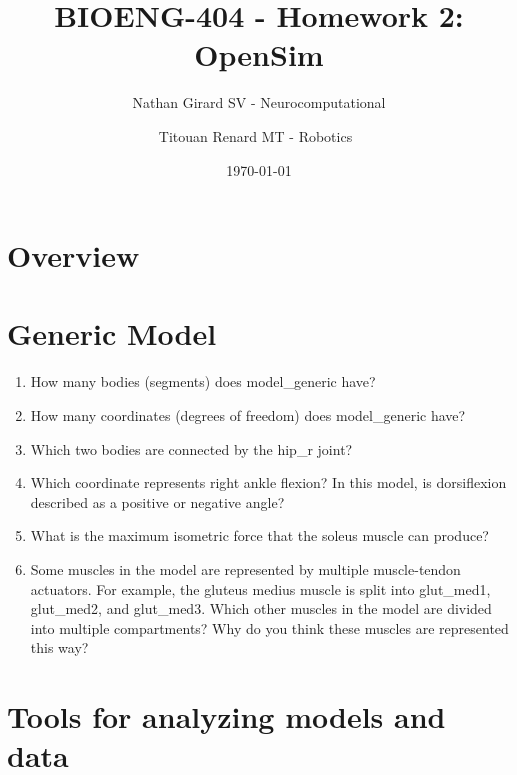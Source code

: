 \documentclass[11pt]{article}
\title{BIOENG-404 - Homework 2: OpenSim}
\author{
    Nathan Girard
        SV - Neurocomputational
        \and
    Titouan Renard
            MT - Robotics 
}
\date{\today}
\begin{document}
\maketitle

\section{Overview}

\section{Generic Model}

\begin{enumerate}
    \item How many bodies (segments) does model\_generic have?
    \item How many coordinates (degrees of freedom) does model\_generic have?
    \item Which two bodies are connected by the hip\_r joint?
    \item Which coordinate represents right ankle flexion? In this model, is dorsiflexion described as a positive or negative angle?
    \item What is the maximum isometric force that the soleus muscle can produce?
    \item Some muscles in the model are represented by multiple muscle-tendon actuators. For example, the gluteus medius muscle is split into glut\_med1, glut\_med2, and glut\_med3. Which other muscles in the model are divided into multiple compartments? Why do you think these muscles are represented this way?
\end{enumerate}

\section{Tools for analyzing models and data}
\end{document}
